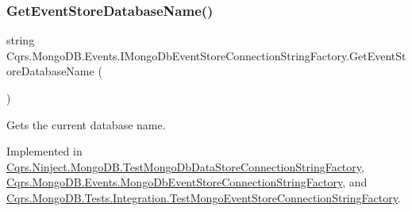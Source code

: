 \mbox{\label{interfaceCqrs_1_1MongoDB_1_1Events_1_1IMongoDbEventStoreConnectionStringFactory_a81ee28bfbb0e567b95f2b280bc6fb298_a81ee28bfbb0e567b95f2b280bc6fb298}} 
\subsubsection{\texorpdfstring{Get\+Event\+Store\+Database\+Name()}{GetEventStoreDatabaseName()}}
{\footnotesize\ttfamily string Cqrs.\+Mongo\+D\+B.\+Events.\+I\+Mongo\+Db\+Event\+Store\+Connection\+String\+Factory.\+Get\+Event\+Store\+Database\+Name (\begin{DoxyParamCaption}{ }\end{DoxyParamCaption})}



Gets the current database name. 



Implemented in \hyperlink{classCqrs_1_1Ninject_1_1MongoDB_1_1TestMongoDbDataStoreConnectionStringFactory_ae34e14a01ee79e427a87b6ef2c220288_ae34e14a01ee79e427a87b6ef2c220288}{Cqrs.\+Ninject.\+Mongo\+D\+B.\+Test\+Mongo\+Db\+Data\+Store\+Connection\+String\+Factory}, \hyperlink{classCqrs_1_1MongoDB_1_1Events_1_1MongoDbEventStoreConnectionStringFactory_a282bda17095c8ea293f5305ea0d1b83c_a282bda17095c8ea293f5305ea0d1b83c}{Cqrs.\+Mongo\+D\+B.\+Events.\+Mongo\+Db\+Event\+Store\+Connection\+String\+Factory}, and \hyperlink{classCqrs_1_1MongoDB_1_1Tests_1_1Integration_1_1TestMongoEventStoreConnectionStringFactory_adbefedfb3bea3521f72333ce47575301_adbefedfb3bea3521f72333ce47575301}{Cqrs.\+Mongo\+D\+B.\+Tests.\+Integration.\+Test\+Mongo\+Event\+Store\+Connection\+String\+Factory}.

